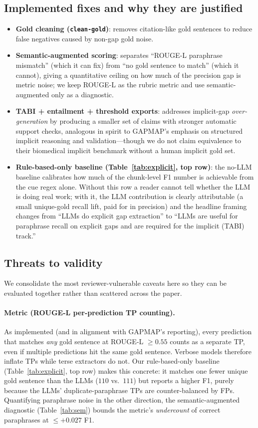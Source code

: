 \documentclass{article}
\begin{document}
\subsection{Implemented fixes and why they are justified}
\begin{itemize}
  \item \textbf{Gold cleaning (\texttt{clean-gold})}: removes citation-like gold sentences to reduce false negatives caused by non-gap gold noise.
  \item \textbf{Semantic-augmented scoring}: separates ``ROUGE-L paraphrase mismatch'' (which it can fix) from ``no gold sentence to match'' (which it cannot), giving a quantitative ceiling on how much of the precision gap is metric noise; we keep ROUGE-L as the rubric metric and use semantic-augmented only as a diagnostic.
  \item \textbf{TABI + entailment + threshold exports}: addresses implicit-gap \emph{over-generation} by producing a smaller set of claims with stronger automatic support checks, analogous in spirit to GAPMAP's emphasis on structured implicit reasoning and validation---though we do not claim equivalence to their biomedical implicit benchmark without a human implicit gold set.
  \item \textbf{Rule-based-only baseline (Table~\ref{tab:explicit}, top row)}: the no-LLM baseline calibrates how much of the chunk-level F1 number is achievable from the cue regex alone. Without this row a reader cannot tell whether the LLM is doing real work; with it, the LLM contribution is clearly attributable (a small unique-gold recall lift, paid for in precision) and the headline framing changes from ``LLMs do explicit gap extraction'' to ``LLMs are useful for paraphrase recall on explicit gaps and are required for the implicit (TABI) track.''
\end{itemize}

\subsection{Threats to validity}\label{sec:threats}
We consolidate the most reviewer-vulnerable caveats here so they can be evaluated together rather than scattered across the paper.

\paragraph{Metric (ROUGE-L per-prediction TP counting).} As implemented (and in alignment with GAPMAP's reporting), every prediction that matches \emph{any} gold sentence at ROUGE-L $\ge 0.55$ counts as a separate TP, even if multiple predictions hit the same gold sentence. Verbose models therefore inflate TPs while terse extractors do not. Our rule-based-only baseline (Table~\ref{tab:explicit}, top row) makes this concrete: it matches one fewer unique gold sentence than the LLMs ($110$ vs.\ $111$) but reports a higher F1, purely because the LLMs' duplicate-paraphrase TPs are counter-balanced by FPs. Quantifying paraphrase noise in the other direction, the semantic-augmented diagnostic (Table~\ref{tab:sem}) bounds the metric's \emph{undercount} of correct paraphrases at $\le +0.027$ F1.
\end{document}
